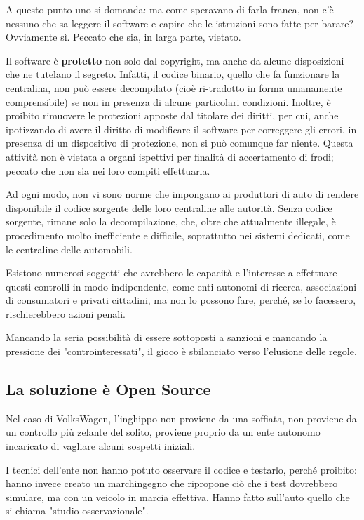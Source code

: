 \documentclass[a4paper, 12pt]{extarticle}
\begin{document}
A questo punto uno si domanda: ma come speravano di farla franca, non
c'è nessuno che sa leggere il software e capire che le istruzioni sono
fatte per barare? Ovviamente sì. Peccato che sia, in larga parte,
vietato.

Il software è \textbf{protetto} non solo dal copyright, ma anche da
alcune disposizioni che ne tutelano il segreto. Infatti, il codice
binario, quello che fa funzionare la centralina, non può essere
decompilato (cioè ri-tradotto in forma umanamente comprensibile) se non
in presenza di alcune particolari condizioni. Inoltre, è proibito
rimuovere le protezioni apposte dal titolare dei diritti, per cui,
anche ipotizzando di avere il diritto di modificare il software per
correggere gli errori, in presenza di un dispositivo di protezione, non
si può comunque far niente. Questa attività non è vietata a organi
ispettivi per finalità di accertamento di frodi; peccato che non sia
nei loro compiti effettuarla.

Ad ogni modo, non vi sono norme che impongano ai produttori di auto di
rendere disponibile il codice sorgente delle loro centraline alle
autorità. Senza codice sorgente, rimane solo la decompilazione, che,
oltre che attualmente illegale, è procedimento molto inefficiente e
difficile, soprattutto nei sistemi dedicati, come le centraline delle
automobili.

Esistono numerosi soggetti che avrebbero le capacità e l'interesse a
effettuare questi controlli in modo indipendente, come enti autonomi di
ricerca, associazioni di consumatori e privati cittadini, ma non lo
possono fare, perché, se lo facessero, rischierebbero azioni penali.

Mancando la seria possibilità di essere sottoposti a sanzioni e
mancando la pressione dei "controinteressati", il gioco è sbilanciato
verso l'elusione delle regole.

\subsection*{La soluzione è Open Source}

Nel caso di VolksWagen, l'inghippo non proviene da una soffiata, non
proviene da un controllo più zelante del solito, proviene proprio da un
ente autonomo incaricato di vagliare alcuni sospetti iniziali.

I tecnici dell'ente non hanno potuto osservare il codice e testarlo,
perché proibito: hanno invece creato un marchingegno che ripropone ciò
che i test dovrebbero simulare, ma con un veicolo in marcia effettiva.
Hanno fatto sull'auto quello che si chiama "studio osservazionale".
\end{document}
